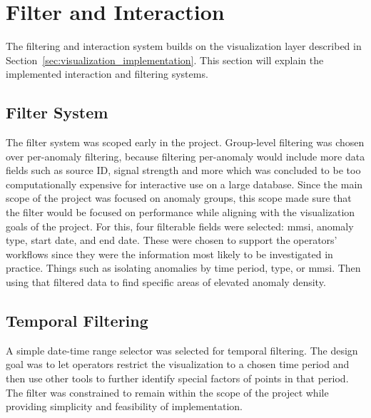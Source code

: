 \section{Filter and Interaction}
\label{sec:filter_and_interaction_method}

The filtering and interaction system builds on the visualization layer described in Section~\ref{sec:visualization_implementation}. This section will explain the implemented interaction and filtering systems.

\subsection{Filter System}

The filter system was scoped early in the project. Group-level filtering was chosen over per-anomaly filtering, because filtering per-anomaly would include more data fields such as source ID, signal strength and more which was concluded to be too computationally expensive for interactive use on a large database. Since the main scope of the project was focused on anomaly groups, this scope made sure that the filter would be focused on performance while aligning with the visualization goals of the project. For this, four filterable fields were selected: \acrshort{mmsi}, anomaly type, start date, and end date. These were chosen to support the operators' workflows since they were the information most likely to be investigated in practice. Things such as isolating anomalies by time period, type, or \acrshort{mmsi}. Then using that filtered data to find specific areas of elevated anomaly density.

\subsection{Temporal Filtering}

A simple date-time range selector was selected for temporal filtering. The design goal was to let operators restrict the visualization to a chosen time period and then use other tools to further identify special factors of points in that period. The filter was constrained to remain within the scope of the project while providing simplicity and feasibility of implementation.


